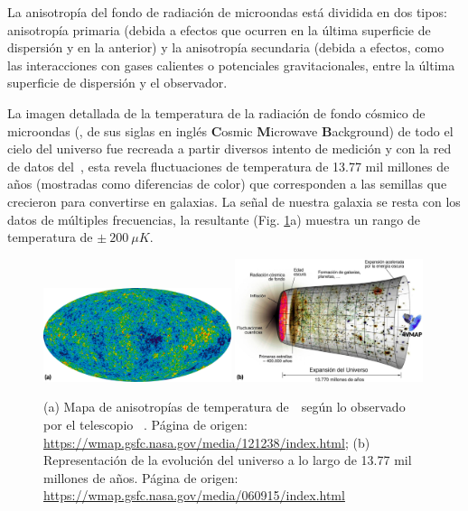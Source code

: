 La anisotropía del fondo de radiación de microondas está dividida en dos tipos: anisotropía primaria (debida a efectos que ocurren en la última superficie de dispersión y en la anterior) y la anisotropía secundaria (debida a efectos, como las interacciones con gases calientes o potenciales gravitacionales, entre la última superficie de dispersión y el observador.




La imagen detallada de la temperatura de la radiación de fondo cósmico de microondas (\CMB, de sus siglas en inglés \textbf{C}osmic \textbf{M}icrowave \textbf{B}ackground) de todo el cielo del universo fue recreada a partir diversos intento de medición y con la red de datos del~\WMAP, esta revela fluctuaciones de temperatura de 13.77 mil millones de años (mostradas como diferencias de color) que corresponden a las semillas que crecieron para convertirse en galaxias. La señal de nuestra galaxia se resta con los datos de múltiples frecuencias, la resultante (Fig. \ref{universo}a) muestra un rango de temperatura de $\pm~200~\mu K$.

\begin{figure}
\centering
\includegraphics[width=0.49\textwidth]{Fisica_de_Particulas/imagenes/universo.png}
\includegraphics[width=0.49\textwidth]{Fisica_de_Particulas/imagenes/Universo_evo0.jpg}
\caption{(a) Mapa de anisotropías de temperatura de~\CMB~según lo observado por el telescopio ~\WMAP. Página de origen: \url{https://wmap.gsfc.nasa.gov/media/121238/index.html}; (b) Representación de la evolución del universo a lo largo de 13.77 mil millones de a\~nos. Página de origen: \url{https://wmap.gsfc.nasa.gov/media/060915/index.html}}
\label{universo}
\end{figure}

